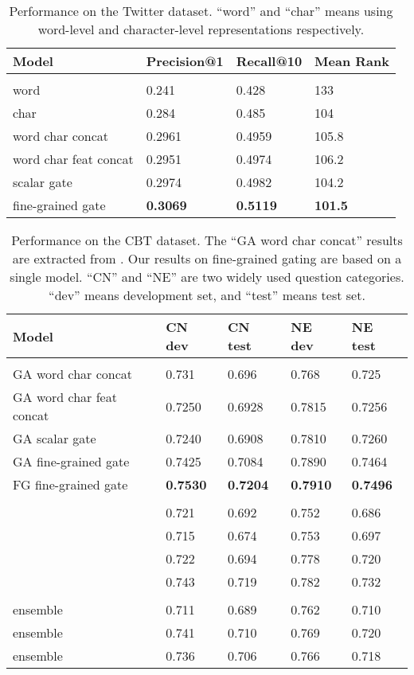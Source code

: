 \documentclass{article} \usepackage{iclr2017_conference,times}
\begin{document}
\begin{table}[t]
\caption{\small Performance on the Twitter dataset. ``word'' and ``char'' means using word-level and character-level representations respectively.}
\label{tab:twitter}
\begin{center}
\begin{tabular}{llll}
Model & Precision@1 & Recall@10 & Mean Rank
\\ \hline \\
word \citep{dhingra2016tweet2vec} & 0.241 & 0.428 & 133 \\
char \citep{dhingra2016tweet2vec} & 0.284 & 0.485 & 104 \\
word char concat & 0.2961 & 0.4959 & 105.8 \\
word char feat concat & 0.2951 & 0.4974 & 106.2 \\
scalar gate & 0.2974 & 0.4982 & 104.2 \\
fine-grained gate & \textbf{0.3069} & \textbf{0.5119} & \textbf{101.5}
\end{tabular}
\end{center}
\end{table}

\begin{table}[t]
\caption{\small Performance on the CBT dataset. The ``GA word char concat'' results are extracted from \cite{dhingra2016gated}. Our results on fine-grained gating are based on a single model. ``CN'' and ``NE'' are two widely used question categories. ``dev'' means development set, and ``test'' means test set.}
\label{tab:cbt}
\begin{center}
\begin{tabular}{lllll}
Model & CN dev & CN test & NE dev & NE test
\\ \hline \\
GA word char concat & 0.731 & 0.696 & 0.768 & 0.725 \\
GA word char feat concat & 0.7250 & 0.6928 & 0.7815 & 0.7256 \\
GA scalar gate & 0.7240 & 0.6908 & 0.7810 & 0.7260 \\
GA fine-grained gate & 0.7425 & 0.7084 & 0.7890 & 0.7464 \\
FG fine-grained gate & \textbf{0.7530} & \textbf{0.7204} & \textbf{0.7910} & \textbf{0.7496} \\
\hline \\
\cite{sordoni2016iterative} & 0.721 & 0.692 & 0.752 & 0.686 \\
\cite{trischler2016natural} & 0.715 & 0.674 & 0.753 & 0.697 \\
\cite{cui2016attention} & 0.722 & 0.694 & 0.778 & 0.720 \\
\cite{munkhdalai2016neural} & 0.743 & 0.719 & 0.782 & 0.732 \\
\hline \\
\cite{kadlec2016text} ensemble & 0.711 & 0.689 & 0.762 & 0.710 \\
\cite{sordoni2016iterative} ensemble & 0.741 & 0.710 & 0.769 & 0.720 \\
\cite{trischler2016natural} ensemble & 0.736 & 0.706 & 0.766 & 0.718
\end{tabular}
\end{center}
\end{table}
\end{document}
